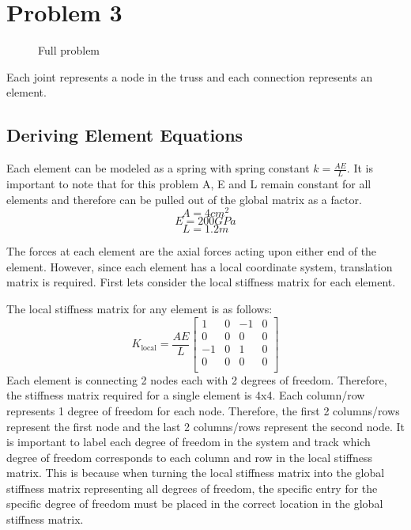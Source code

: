 \documentclass[8pt]{article}
\begin{document}
\section{Problem 3}
\label{sec:Problem 3}

\begin{figure}[h!]
    \centering
    \caption{Full problem}
\end{figure}

Each joint represents a node in the truss and each connection represents an element. 
\subsection{Deriving Element Equations}

Each element can be modeled as a spring with spring 
constant $k=\frac{AE}{L}$. It is important to note that for this problem A, E and L remain constant for all elements and therefore can be pulled out of the global matrix as a factor.
$$A=4cm^2$$
$$E=200GPa$$
$$L=1.2m$$

The forces at each element are the axial forces acting upon either end of the element. However, since each element has a local coordinate
system, translation matrix is required. First lets consider the local stiffness matrix for each element.

The local stiffness matrix for any element is as follows:
\[
K_{\text{local}} = \frac{AE}{L}
\begin{bmatrix}
    1 & 0 & -1 & 0 \\
    0 & 0 & 0 & 0 \\
    -1 & 0 & 1 & 0 \\
    0 & 0 & 0 & 0 \\
\end{bmatrix}
\]
Each element is connecting 2 nodes each with 2 degrees of freedom. Therefore, the stiffness matrix 
required for a single element is 4x4.
Each column/row represents 1 degree of freedom for each node. Therefore, the first 2 columns/rows represent the first node and the last 2 columns/rows represent the second node. 
It is important to label each degree of freedom in the system and track which degree of freedom corresponds to each column and row in the local stiffness matrix.
This is because when turning the local stiffness matrix into the global stiffness matrix representing all degrees of freedom, the specific entry for the specific 
degree of freedom must be placed in the correct location in the global stiffness matrix.
\end{document}
